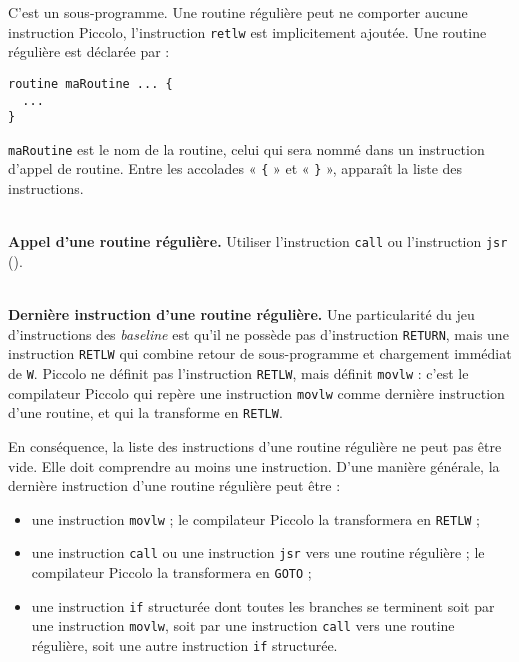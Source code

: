 
C'est un sous-programme. Une routine régulière peut ne comporter aucune instruction Piccolo, l'instruction \texttt{retlw} est implicitement ajoutée. Une routine régulière est déclarée par :
\begin{lstlisting}[language=piccolo]
routine maRoutine ... {
  ...
}
\end{lstlisting}

\texttt{maRoutine} est le nom de la routine, celui qui sera nommé dans un instruction d’appel de routine. Entre les accolades « \texttt{\{} » et « \texttt{\}} », apparaît la liste des instructions.

~\\
\textbf{Appel d’une routine régulière.} Utiliser l'instruction \texttt{call} ou l'instruction \texttt{jsr} ().

~\\
\textbf{Dernière instruction d’une routine régulière.} Une particularité du jeu d'instructions des \emph{baseline} est qu'il ne possède pas d'instruction \texttt{RETURN}, mais une instruction \texttt{RETLW} qui combine retour de sous-programme et chargement immédiat de \texttt{W}. Piccolo ne définit pas l'instruction \texttt{RETLW}, mais définit \texttt{movlw} : c'est le compilateur Piccolo qui repère une instruction \texttt{movlw} comme dernière instruction d'une routine, et qui la transforme en \texttt{RETLW}.

En conséquence, la liste des instructions d'une routine régulière ne peut pas être vide. Elle doit comprendre au moins une instruction. D'une manière générale, la dernière instruction d'une routine régulière peut être :
\begin{itemize}
  \item une instruction \texttt{movlw} ; le compilateur Piccolo la transformera en \texttt{RETLW} ;
  \item une instruction \texttt{call} ou une instruction \texttt{jsr} vers une routine régulière ; le compilateur Piccolo la transformera en \texttt{GOTO} ;
  \item une instruction \texttt{if} structurée dont toutes les branches se terminent soit par une instruction \texttt{movlw}, soit par une instruction \texttt{call} vers une routine régulière, soit une autre instruction \texttt{if} structurée.
\end{itemize}

